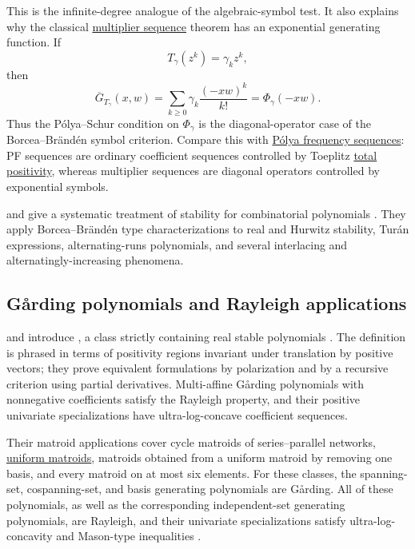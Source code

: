 This is the infinite-degree analogue of the algebraic-symbol test.  It also
explains why the classical \hyperref[multiplierSequences]{multiplier
sequence} theorem has an exponential generating function.  If
\[
  T_\gamma(z^k)=\gamma_k z^k,
\]
then
\[
  \overline{G}_{T_\gamma}(x,w)
  =
  \sum_{k\geq 0}\gamma_k\frac{(-xw)^k}{k!}
  =
  \Phi_\gamma(-xw).
\]
Thus the Pólya--Schur condition on \(\Phi_\gamma\) is the diagonal-operator
case of the Borcea--Brändén symbol criterion.  Compare this with
\hyperref[polyaFrequency]{Pólya frequency sequences}: PF sequences are
ordinary coefficient sequences controlled by Toeplitz
\hyperref[totalPositivity]{total positivity},
whereas multiplier sequences are diagonal operators controlled by exponential
symbols.

 and  give a systematic treatment of
stability for combinatorial polynomials \cite{DingZhu2021Stability}.  They
apply Borcea--Br\"and\'en type characterizations to real and Hurwitz stability,
Tur\'an expressions, alternating-runs polynomials, and several interlacing and
alternatingly-increasing phenomena.

\subsection[gardingPolynomials]{G{\aa}rding polynomials and Rayleigh applications}

 and  introduce
\label{gardingPolynomial}, a class strictly
containing real stable
polynomials \cite{FangMa2026x}.  The definition is phrased in terms of
positivity regions invariant under translation by positive vectors; they prove
equivalent formulations by polarization and by a recursive criterion using
partial derivatives.  Multi-affine G{\aa}rding polynomials with nonnegative
coefficients satisfy the Rayleigh property, and their positive univariate
specializations have ultra-log-concave coefficient sequences.

Their matroid applications cover cycle matroids of series--parallel
networks, \hyperref[uniformMatroid]{uniform matroids}, matroids obtained from
a uniform matroid by removing one basis, and every matroid on at most six
elements.  For these classes, the spanning-set, cospanning-set, and basis
generating polynomials are G{\aa}rding.  All of these polynomials, as well as
the corresponding independent-set generating polynomials, are Rayleigh, and
their univariate specializations satisfy ultra-log-concavity and Mason-type
inequalities \cite[Thm.~1.3]{FangMa2026x}.


